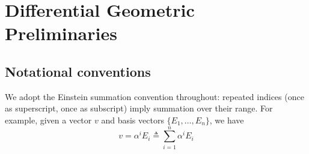 



\section{Differential Geometric Preliminaries}
\subsection{Notational conventions}\label{sec:notationalconventions}

We adopt the Einstein summation convention throughout: repeated indices (once as superscript, once as subscript) imply summation over their range. For example, given a vector $v$ and basis vectors $\{E_1,\ldots,E_n\}$, we have
\begin{equation}\label{eq:esc}
v = \alpha^i E_i \triangleq \sum_{i=1}^n \alpha^i E_i
\end{equation}

